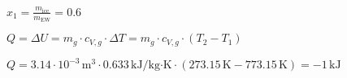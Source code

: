 \( x_1 = \frac{m_{\text{ice}}}{m_{\text{EW}}} = 0.6 \)  

\( Q = \Delta U = m_g \cdot c_{V,g} \cdot \Delta T = m_g \cdot c_{V,g} \cdot (T_2 - T_1) \)  

\( Q = 3.14 \cdot 10^{-3} \, \text{m}^3 \cdot 0.633 \, \text{kJ/kg·K} \cdot \left(273.15 \, \text{K} - 773.15 \, \text{K}\right) = -1 \, \text{kJ} \)